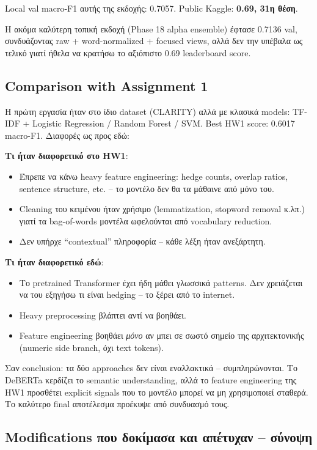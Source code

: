 \documentclass[12pt]{fphw}
\begin{document}
Local val macro-F1 αυτής της εκδοχής: 0.7057. Public Kaggle: \textbf{0.69, 31η θέση}.

Η ακόμα καλύτερη τοπική εκδοχή (Phase 18 alpha ensemble) έφτασε 0.7136 val, συνδυάζοντας raw + word-normalized + focused views, αλλά δεν την υπέβαλα ως τελικό γιατί ήθελα να κρατήσω το αξιόπιστο 0.69 leaderboard score.

\subsection{Comparison with Assignment 1}

Η πρώτη εργασία ήταν στο ίδιο dataset (CLARITY) αλλά με κλασικά models: TF-IDF + Logistic Regression / Random Forest / SVM. Best HW1 score: 0.6017 macro-F1. Διαφορές ως προς εδώ:

\textbf{Τι ήταν διαφορετικό στο HW1}:
\begin{itemize}
    \item Έπρεπε να κάνω heavy feature engineering: hedge counts, overlap ratios, sentence structure, etc. -- το μοντέλο δεν θα τα μάθαινε από μόνο του.
    \item Cleaning του κειμένου ήταν χρήσιμο (lemmatization, stopword removal κ.λπ.) γιατί τα bag-of-words μοντέλα ωφελούνται από vocabulary reduction.
    \item Δεν υπήρχε ``contextual'' πληροφορία -- κάθε λέξη ήταν ανεξάρτητη.
\end{itemize}

\textbf{Τι ήταν διαφορετικό εδώ}:
\begin{itemize}
    \item Το pretrained Transformer έχει ήδη μάθει γλωσσικά patterns. Δεν χρειάζεται να του εξηγήσω τι είναι hedging -- το ξέρει από το internet.
    \item Heavy preprocessing βλάπτει αντί να βοηθάει.
    \item Feature engineering βοηθάει \emph{μόνο} αν μπει σε σωστό σημείο της αρχιτεκτονικής (numeric side branch, όχι text tokens).
\end{itemize}

Σαν conclusion: τα δύο approaches δεν είναι εναλλακτικά -- συμπληρώνονται. Το DeBERTa κερδίζει το semantic understanding, αλλά το feature engineering της HW1 προσθέτει explicit signals που το μοντέλο μπορεί να μη χρησιμοποιεί σταθερά. Το καλύτερο final αποτέλεσμα προέκυψε από συνδυασμό τους.

\subsection{Modifications που δοκίμασα και απέτυχαν -- σύνοψη}
\end{document}
